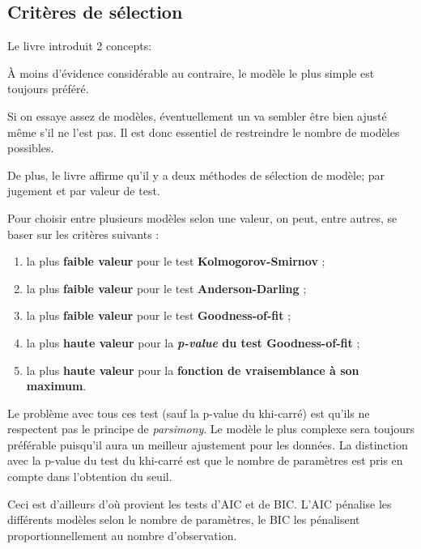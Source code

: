 \documentclass[10pt, french]{article}
\begin{document}
\begin{multicols*}{3}
\setlength{\mathindent}{1cm}



\subsection*{Critères de sélection}

Le livre introduit 2 concepts:
\begin{description}
	\item[Parsimony:] À moins d'évidence considérable au contraire, le modèle le plus simple est toujours préféré.
	\item	Si on essaye assez de modèles, éventuellement un va sembler être bien ajusté même s'il ne l'est pas. 
	Il est donc essentiel de restreindre le nombre de modèles possibles.
\end{description}

De plus, le livre affirme qu'il y a deux méthodes de sélection de modèle; par jugement et par valeur de test.

Pour choisir entre plusieurs modèles selon une valeur, on peut, entre autres, se baser sur les critères suivants : 
\begin{enumerate}
\item la plus \textbf{faible valeur} pour le test \textbf{Kolmogorov-Smirnov} ; 
\item la plus \textbf{faible valeur} pour le test \textbf{Anderson-Darling} ;
\item la plus \textbf{faible valeur} pour le test \textbf{Goodness-of-fit} ;
\item la plus \textbf{haute valeur} pour la \textbf{\emph{p-value} du test Goodness-of-fit} ; 
\item la plus \textbf{haute valeur} pour la \textbf{fonction de vraisemblance à son maximum}.
\end{enumerate}

Le problème avec tous ces test (sauf la p-value du khi-carré) est qu'ils ne respectent pas le principe de \textit{parsimony}. 
Le modèle le plus complexe sera toujours préférable puisqu'il aura un meilleur ajustement pour les données.
La distinction avec la p-value du test du khi-carré est que le nombre de paramètres est pris en compte dans l'obtention du seuil.

Ceci est d'ailleurs d'où provient les tests d'AIC et de BIC. L'AIC pénalise les différents modèles selon le nombre de paramètres, le BIC les pénalisent proportionnellement au nombre d'observation.


\end{multicols*}
\end{document}
